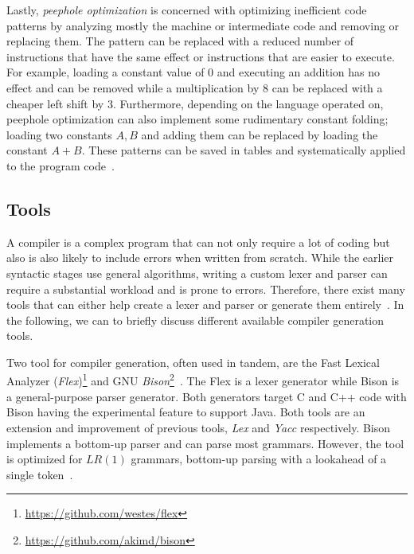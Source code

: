 Lastly, \emph{peephole optimization} is concerned with optimizing inefficient code patterns by analyzing mostly the machine or intermediate code and removing or replacing them. The pattern can be replaced with a reduced number of instructions that have the same effect or instructions that are easier to execute. For example, loading a constant value of $0$ and executing an addition has no effect and can be removed while a multiplication by $8$ can be replaced with a cheaper left shift by $3$. Furthermore, depending on the language operated on, peephole optimization can also implement some rudimentary constant folding; loading two constants $A, B$ and adding them can be replaced by loading the constant $A + B$. These patterns can be saved in tables and systematically applied to the program code~\cite{McKe65,TvS82}.

\subsection{Tools}
\label{sec:background_compilerTools}
A compiler is a complex program that can not only require a lot of coding but also is also likely to include errors when written from scratch. While the earlier syntactic stages use general algorithms, writing a custom lexer and parser can require a substantial workload and is prone to errors. Therefore, there exist many tools that can either help create a lexer and parser or generate them entirely~\cite{PaFi11, ZLY17}. In the following, we can to briefly discuss different available compiler generation tools.

Two tool for compiler generation, often used in tandem, are the Fast Lexical Analyzer (\emph{Flex})\footnote{\url{https://github.com/westes/flex}} and GNU \emph{Bison}\footnote{\url{https://github.com/akimd/bison}}~\cite{DoSt99}. 
The Flex is a lexer generator while Bison is a general-purpose parser generator. Both generators target C and C++ code with Bison having the experimental feature to support Java. 
Both tools are an extension and improvement of previous tools, \emph{Lex} and \emph{Yacc} respectively. 
Bison implements a bottom-up parser and can parse most grammars. However, the tool is optimized for $LR(1)$ grammars, \ie bottom-up parsing with a lookahead of a single token~\cite{ZLY17,Aaby03,DoSt99}. 

